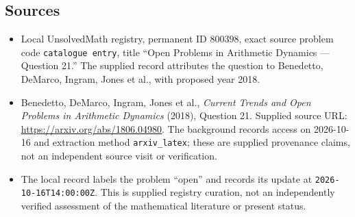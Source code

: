 \documentclass[11pt]{article}
\begin{document}
\subsection{Sources}
\begin{itemize}
\item Local UnsolvedMath registry, permanent ID \(800398\), exact source problem code \texttt{catalogue entry}, title ``Open Problems in Arithmetic Dynamics --- Question 21.'' The supplied record attributes the question to Benedetto, DeMarco, Ingram, Jones et al., with proposed year 2018.
\item Benedetto, DeMarco, Ingram, Jones et al., \emph{Current Trends and Open Problems in Arithmetic Dynamics} (2018), Question 21. Supplied source URL: \url{https://arxiv.org/abs/1806.04980}. The background records access on 2026-10-16 and extraction method \texttt{arxiv\_latex}; these are supplied provenance claims, not an independent source visit or verification.
\item The local record labels the problem ``open'' and records its update at \texttt{2026-10-16T14:00:00Z}. This is supplied registry curation, not an independently verified assessment of the mathematical literature or present status.
\end{itemize}
\end{document}
